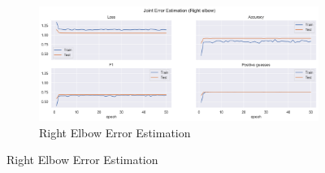 \begin{figure}[!htbp]
\begin{subfigure}[b]{0.47\linewidth}
      \label{fig:v1_leel_jt_ee}
  \end{subfigure}
  \hfill
  \begin{subfigure}[b]{0.47\linewidth}
      \centering
      \includegraphics[width=\textwidth]{figures/Results/v1/jt/Right elbow_ErrorEstimation.png}
      \caption{Right Elbow Error Estimation}
      \label{fig:v1_reel_jt_ee}
  \end{subfigure}
\end{figure}



